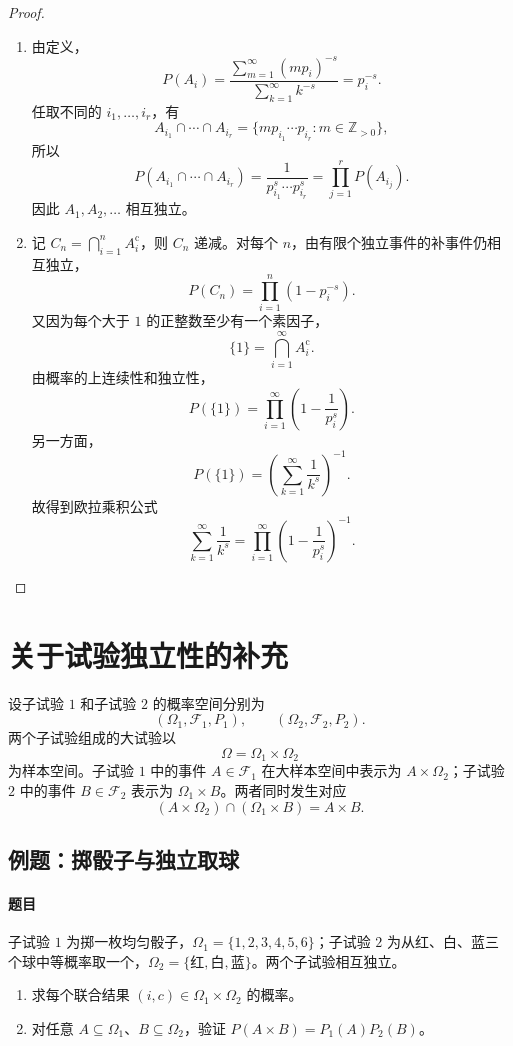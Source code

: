\begin{proof}
\begin{enumerate}
\item 由定义，
\[P(A_i)=\frac{\sum_{m=1}^\infty(mp_i)^{-s}}{\sum_{k=1}^\infty k^{-s}}=p_i^{-s}.\]
任取不同的 $i_1,\ldots,i_r$，有
\[
A_{i_1}\cap\cdots\cap A_{i_r}
=\{mp_{i_1}\cdots p_{i_r}:m\in\mathbb Z_{>0}\},
\]
所以
\[
P(A_{i_1}\cap\cdots\cap A_{i_r})
=\frac1{p_{i_1}^s\cdots p_{i_r}^s}
=\prod_{j=1}^{r}P(A_{i_j}).
\]
因此 $A_1,A_2,\ldots$ 相互独立。
\item 记 $C_n=\bigcap_{i=1}^n A_i^{\mathrm c}$，则 $C_n$ 递减。对每个 $n$，由有限个独立事件的补事件仍相互独立，
\[P(C_n)=\prod_{i=1}^n(1-p_i^{-s}).\]
又因为每个大于 $1$ 的正整数至少有一个素因子，
\[
\{1\}=\bigcap_{i=1}^{\infty}A_i^{\mathrm c}.
\]
由概率的上连续性和独立性，
\[
P(\{1\})
=\prod_{i=1}^{\infty}\left(1-\frac1{p_i^s}\right).
\]
另一方面，
\[
P(\{1\})=\left(\sum_{k=1}^{\infty}\frac1{k^s}\right)^{-1}.
\]
故得到欧拉乘积公式
\[
\sum_{k=1}^{\infty}\frac1{k^s}
=\prod_{i=1}^{\infty}\left(1-\frac1{p_i^s}\right)^{-1}.
\]
\end{enumerate}
\end{proof}

\clearpage\section{关于试验独立性的补充}\label{k:product}

设子试验 $1$ 和子试验 $2$ 的概率空间分别为
\[
(\Omega_1,\mathscr F_1,P_1),
\qquad
(\Omega_2,\mathscr F_2,P_2).
\]
两个子试验组成的大试验以
\[
\Omega=\Omega_1\times\Omega_2
\]
为样本空间。子试验 $1$ 中的事件 $A\in\mathscr F_1$ 在大样本空间中表示为 $A\times\Omega_2$；子试验 $2$ 中的事件 $B\in\mathscr F_2$ 表示为 $\Omega_1\times B$。两者同时发生对应
\[
(A\times\Omega_2)\cap(\Omega_1\times B)=A\times B.
\]

\subsection{例题：掷骰子与独立取球}\label{note:c1:e31}
\paragraph{题目}
子试验 $1$ 为掷一枚均匀骰子，$\Omega_1=\{1,2,3,4,5,6\}$；子试验 $2$ 为从红、白、蓝三个球中等概率取一个，$\Omega_2=\{\text{红},\text{白},\text{蓝}\}$。两个子试验相互独立。
\begin{enumerate}
\item 求每个联合结果 $(i,c)\in\Omega_1\times\Omega_2$ 的概率。
\item 对任意 $A\subseteq\Omega_1$、$B\subseteq\Omega_2$，验证 $P(A\times B)=P_1(A)P_2(B)$。
\end{enumerate}

